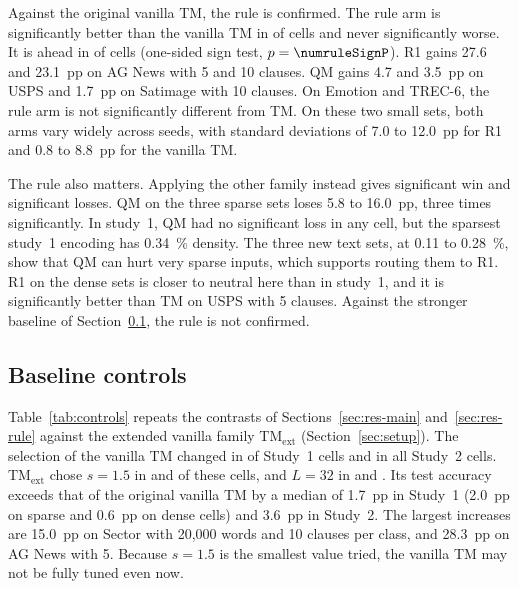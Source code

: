 \documentclass[preprint,12pt,times]{elsarticle}
\newcommand{\add}[1]{{\color{blue}#1}}
\newcommand{\del}[1]{\textcolor{blue}{\sout{#1}}}
\begin{document}
Against the original vanilla TM, the rule is confirmed.
The rule arm is significantly better than the vanilla TM in \numruleWin{} of \numruleN{} cells and never significantly worse.
It is ahead in \numrulePos{} of \numruleN{} cells (one-sided sign test, $p = \numruleSignP$).
R1 gains 27.6 and 23.1~pp on AG News with 5 and 10 clauses.
QM gains 4.7 and 3.5~pp on USPS and 1.7~pp on Satimage with 10 clauses.
On Emotion and TREC-6, the rule arm is not significantly different from TM.
On these two small sets, both arms vary widely across seeds, with standard deviations of 7.0 to 12.0~pp for R1 and 0.8 to 8.8~pp for the vanilla TM.

The rule also matters.
Applying the other family instead gives \numotherWin{} significant win and \numotherLoss{} significant losses.
QM on the three sparse sets loses 5.8 to 16.0~pp, three times significantly.
In study~1, QM had no significant loss in any cell, but the sparsest study~1 encoding has \SI{0.34}{\percent} density. The three new text sets, at 0.11 to \SI{0.28}{\percent}, show that QM can hurt very sparse inputs, which supports routing them to R1.
R1 on the dense sets is closer to neutral here than in study~1, and it is significantly better than TM on USPS with 5 clauses.
Against the stronger baseline of Section~\ref{sec:res-base}, the rule is not confirmed.

\subsection{Baseline controls}
\label{sec:res-base}
Table~\ref{tab:controls} repeats the contrasts of Sections~\ref{sec:res-main} and~\ref{sec:res-rule} against the extended vanilla family TM$_{\mathrm{ext}}$ (Section~\ref{sec:setup}).
The selection of the vanilla TM changed in \ctlChangedOne{} of \ctlCellsOne{} Study~1 cells and in all \ctlCellsTwo{} Study~2 cells.
TM$_{\mathrm{ext}}$ chose $s = 1.5$ in \ctlSlowOne{} and \ctlSlowTwo{} of these cells, and $L = 32$ in \ctlLthreeOne{} and \ctlLthreeTwo{}.
Its test accuracy exceeds that of the original vanilla TM by a median of 1.7~pp in Study~1 (2.0~pp on sparse and 0.6~pp on dense cells) and 3.6~pp in Study~2.
The largest increases are 15.0~pp on Sector with 20,000 words and 10 clauses per class, and 28.3~pp on AG News with 5.
Because $s = 1.5$ is the smallest value tried, the vanilla TM may not be fully tuned even now.

\begin{table}[!htbp]
\centering
\caption{Contrasts against the original vanilla TM and against the extended vanilla family TM$_{\mathrm{ext}}$ (test accuracy, five seeds, Welch, Holm within each contrast and baseline). W/L: significant wins and losses. Med.: median gain in pp. Sparse: training density below \SI{3}{\percent}. \del{Only the vanilla TM is re-tuned.} \add{Original: neither arm re-tuned. Extended: only the vanilla TM re-tuned. Both re-tuned: $s = 1.5$ also offered to TMR, QM and QMR. QP and QPR are not re-tuned.} ``Best other'' is the better of TMR and the vanilla TM on validation. The Study~2 TMR and QM rows are descriptive additions to the control protocol.}
\label{tab:controls}
\vspace{3pt}
\small

\end{table}
\end{document}
